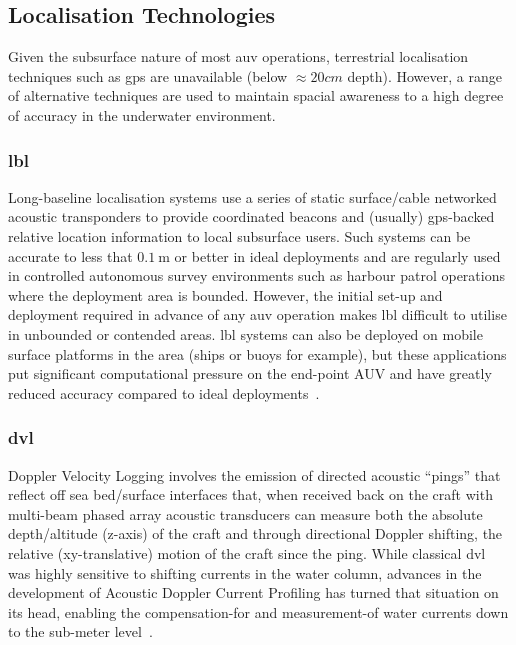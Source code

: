 \subsection{Localisation Technologies}\label{sec:localisation-technologies}

Given the subsurface nature of most \gls{auv} operations, terrestrial localisation techniques such as \gls{gps} are unavailable (below $\approx 20cm$ depth). 
However, a range of alternative techniques are used to maintain spacial awareness to a high degree of accuracy in the underwater environment.
\subsubsection{\gls{lbl}}
Long-baseline localisation systems use a series of static surface/cable networked acoustic transponders to provide coordinated beacons and (usually) \gls{gps}-backed relative location information to local subsurface users. 
Such systems can be accurate to less that $0.\SI{1}{\meter}$ or better in ideal deployments and are regularly used in controlled autonomous survey environments such as harbour patrol operations where the deployment area is bounded. 
However, the initial set-up and deployment required in advance of any \gls{auv} operation makes \gls{lbl} difficult to utilise in unbounded or contended areas.
\gls{lbl} systems can also be deployed on mobile surface platforms in the area (ships or buoys for example), but these applications put significant computational pressure on the end-point AUV and have greatly reduced accuracy compared to ideal deployments~\cite{Matos1999}.
\subsubsection{\gls{dvl}}
Doppler Velocity Logging involves the emission of directed acoustic ``pings'' that reflect off sea bed/surface interfaces that, when received back on the craft with multi-beam phased array acoustic transducers can measure both the absolute depth/altitude (z-axis) of the craft and through directional Doppler shifting, the relative (xy-translative) motion of the craft since the ping.
While classical \gls{dvl} was highly sensitive to shifting currents in the water column, advances in the development of Acoustic Doppler Current Profiling has turned that situation on its head, enabling the compensation-for and measurement-of water currents down to the sub-meter level~\cite{Snyder2010}.
